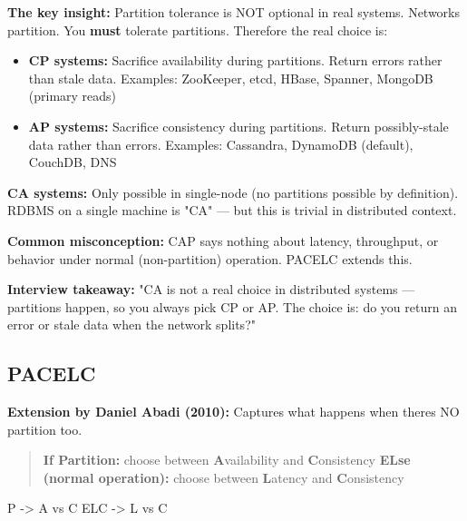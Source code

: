 \documentclass[11pt]{article}
\providecommand{\tightlist}{\setlength{\itemsep}{1pt}\setlength{\parskip}{0pt}}
\newenvironment{Shaded}{\begin{snugshade}}{\end{snugshade}}
\newcommand{\NormalTok}[1]{\textcolor[rgb]{0.81,0.81,0.76}{#1}}
\newcommand{\OperatorTok}[1]{\textcolor[rgb]{0.81,0.81,0.76}{#1}}
\begin{document}
\textbf{The key insight:} Partition tolerance is NOT optional in real systems. Networks partition. You \textbf{must} tolerate partitions. Therefore the real choice is:

\begin{itemize}
\tightlist
\item
  \textbf{CP systems:} Sacrifice availability during partitions. Return errors rather than stale data. Examples: ZooKeeper, etcd, HBase, Spanner, MongoDB (primary reads)
\item
  \textbf{AP systems:} Sacrifice consistency during partitions. Return possibly-stale data rather than errors. Examples: Cassandra, DynamoDB (default), CouchDB, DNS
\end{itemize}

\textbf{CA systems:} Only possible in single-node (no partitions possible by definition). RDBMS on a single machine is "CA" --- but this is trivial in distributed context.

\textbf{Common misconception:} CAP says nothing about latency, throughput, or behavior under normal (non-partition) operation. PACELC extends this.

\textbf{Interview takeaway:} "CA is not a real choice in distributed systems --- partitions happen, so you always pick CP or AP. The choice is: do you return an error or stale data when the network splits?"

\subsection{PACELC}\label{pacelc}

\textbf{Extension by Daniel Abadi (2010):} Captures what happens when there\textquotesingle s NO partition too.

\begin{quote}
\textbf{If Partition:} choose between \textbf{A}vailability and \textbf{C}onsistency
\textbf{ELse (normal operation):} choose between \textbf{L}atency and \textbf{C}onsistency
\end{quote}


\begin{Shaded}
\begin{Highlighting}[]
\NormalTok{P }\OperatorTok{{-}\textgreater{}}\NormalTok{ A vs C}
\NormalTok{ELC }\OperatorTok{{-}\textgreater{}}\NormalTok{ L vs C}
\end{Highlighting}
\end{Shaded}
\end{document}

